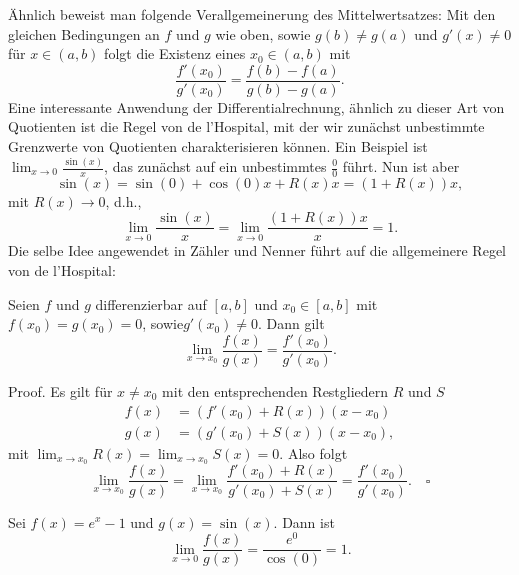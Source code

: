 Ähnlich beweist man folgende Verallgemeinerung des Mittelwertsatzes: Mit den gleichen Bedingungen an \(f\) und \(g\) wie oben, sowie \(g(b) \neq g(a)\) und \(g'(x) \neq 0\) für \(x \in (a,b)\) folgt die Existenz eines \(x_0 \in (a,b)\) mit
\begin{equation*}
\frac{f'(x_0)}{g'(x_0)} = \frac{f(b) - f(a)}{g(b) - g(a)}.
\end{equation*}
Eine interessante Anwendung der Differentialrechnung, ähnlich zu dieser Art von Quotienten ist die Regel von de l’Hospital, mit der wir zunächst unbestimmte Grenzwerte von Quotienten charakterisieren können. Ein Beispiel ist\( \lim_{x \rightarrow 0} \frac{\sin(x)}x\), das zunächst auf ein unbestimmtes \(\frac{0}0\) führt. Nun ist aber
\begin{equation*}
\sin(x) = \sin(0) + \cos(0)x + R(x)x = (1+R(x))x,
\end{equation*}
mit \(R(x) \rightarrow 0\), d.h.,
\begin{equation*}
 \lim_{x \rightarrow 0} \frac{\sin(x)}x = \lim_{x \rightarrow 0} \frac{(1+R(x))x}x = 1.
\end{equation*}
Die selbe Idee angewendet in Zähler und Nenner führt auf die allgemeinere Regel von de l’Hospital:
\label{differential/mws:theorem-2}
\begin{theorem}{}{}



Seien \(f\) und \(g\) differenzierbar auf \([a,b]\) und \(x_0 \in [a,b]\) mit \(f(x_0)=g(x_0) = 0\), sowie\(g'(x_0) \neq 0\). Dann gilt
\begin{equation*}
 \lim_{x \rightarrow x_0} \frac{f(x)}{g(x)} = \frac{f'(x_0)}{g'(x_0)}.
\end{equation*}\end{theorem}

\begin{emphBox}{}{}
Proof.  Es gilt für \(x \neq x_0\) mit den entsprechenden Restgliedern \(R\) und \(S\)
\begin{align*}
f(x) &= (f'(x_0) + R(x))(x-x_0) \\
g(x) &= (g'(x_0) + S(x))(x-x_0),
\end{align*}
mit \(\lim_{x \rightarrow x_0} R(x) = \lim_{x \rightarrow x_0} S(x) =0. \)
Also folgt
\begin{equation*}
\lim_{x \rightarrow x_0} \frac{f(x)}{g(x)} = \lim_{x \rightarrow x_0} \frac{f'(x_0) + R(x)}{g'(x_0) + S(x)} = \frac{f'(x_0)}{g'(x_0)}.  \quad\square
\end{equation*}\end{emphBox}
\label{differential/mws:example-3}
\begin{example}{}{}



Sei \(f(x) = e^x-1\) und \(g(x) = \sin(x)\). Dann ist
\begin{equation*}
 \lim_{x \rightarrow 0} \frac{f(x)}{g(x)} = \frac{e^0}{\cos(0)} = 1.
\end{equation*}\end{example}


